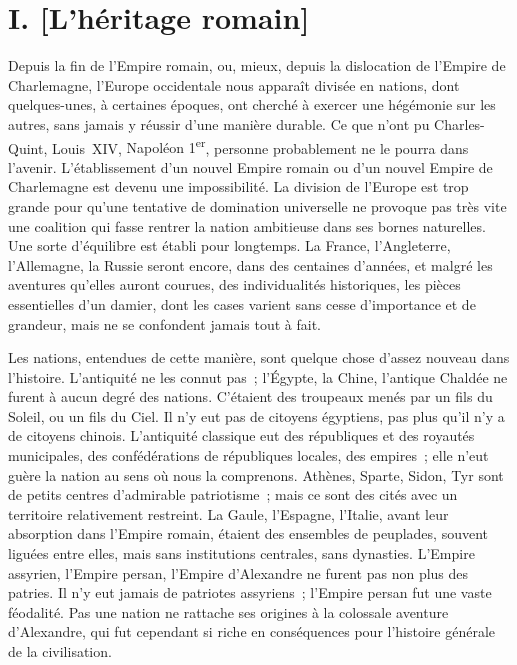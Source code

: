 \documentclass[twoside]{book} %
\newcommand\orgName[1]{#1}
\newcommand\persName[1]{#1}
\newcommand\placeName[1]{#1}
\newcommand\chapteropen{} %
\newcommand\chaptercont{} %
\begin{document}
\chapteropen

\chapter[{I. [L’héritage romain]}]{I. [L’héritage romain]}
\renewcommand{\leftmark}{I. [L’héritage romain]}


\chaptercont
\noindent Depuis la fin de l’{\orgName Empire romain}, ou, mieux, depuis la dislocation de l’{\orgName Empire de Charlemagne}, l’{\placeName Europe occidentale} nous apparaît divisée en nations, dont quelques-unes, à certaines époques, ont cherché à exercer une hégémonie sur les autres, sans jamais y réussir d’une manière durable. Ce que n’ont pu {\persName Charles-Quint}, {\persName Louis XIV}, {\persName Napoléon 1\textsuperscript{er}}, personne probablement ne le pourra dans l’avenir. L’établissement d’un nouvel {\orgName Empire romain} ou d’un nouvel {\orgName Empire de Charlemagne} est devenu une impossibilité. La division de l’{\orgName Europe} est trop grande pour qu’une tentative de domination universelle ne provoque pas très vite une coalition qui fasse rentrer la nation ambitieuse dans ses bornes naturelles. Une sorte d’équilibre est établi pour longtemps. La {\orgName France}, l’{\orgName Angleterre}, l’{\orgName Allemagne}, la {\orgName Russie} seront encore, dans des centaines d’années, et malgré les aventures qu’elles auront courues, des individualités historiques, les pièces essentielles d’un damier, dont les cases varient sans cesse d’importance et de grandeur, mais ne se confondent jamais tout à fait.\par
Les nations, entendues de cette manière, sont quelque chose d’assez nouveau dans l’histoire. L’antiquité ne les connut pas ; l’{\orgName Égypte}, la {\orgName Chine}, l’antique {\orgName Chaldée} ne furent à aucun degré des nations. C’étaient des troupeaux menés par un fils du Soleil, ou un fils du Ciel. Il n’y eut pas de citoyens égyptiens, pas plus qu’il n’y a de citoyens chinois. L’antiquité classique eut des républiques et des royautés municipales, des confédérations de républiques locales, des empires ; elle n’eut guère la nation au sens où nous la comprenons. {\orgName Athènes}, {\orgName Sparte}, {\orgName Sidon}, {\orgName Tyr} sont de petits centres d’admirable patriotisme ; mais ce sont des cités avec un territoire relativement restreint. La {\orgName Gaule}, l’{\orgName Espagne}, l’{\orgName Italie}, avant leur absorption dans l’{\orgName Empire romain}, étaient des ensembles de peuplades, souvent liguées entre elles, mais sans institutions centrales, sans dynasties. L’{\orgName Empire assyrien}, l’{\orgName Empire persan}, l’{\orgName Empire d’Alexandre} ne furent pas non plus des patries. Il n’y eut jamais de patriotes assyriens ; l’{\orgName Empire persan} fut une vaste féodalité. Pas une nation ne rattache ses origines à la colossale aventure d’{\persName Alexandre}, qui fut cependant si riche en conséquences pour l’histoire générale de la civilisation.\par
\end{document}

